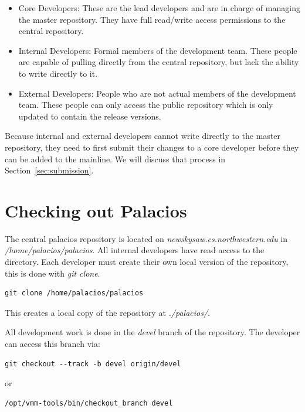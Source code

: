 \documentclass[11pt]{article}
\begin{document}
\begin{itemize}
\item Core Developers: These are the lead developers and are in
charge of managing the master repository. They have full read/write
access permissions to the central repository.

\item Internal Developers: Formal members of the development
team. These people are capable of pulling directly from the central
repository, but lack the ability to write directly to it. 

\item External Developers: People who are not actual members of the
development team. These people can only access the public repository
which is only updated to contain the release versions. 
\end{itemize}

Because internal and external developers cannot write directly to the
master repository, they need to first submit their changes to a core
developer before they can be added to the mainline. We will discuss
that process in Section~\ref{sec:submission}.


\section{Checking out Palacios}
The central palacios repository is located on {\em
newskysaw.cs.northwestern.edu} in {\em /home/palacios/palacios}. All
internal developers have read access to the directory. Each developer
must create their own local version of the repository, this is done
with {\em git clone}.

\begin{verbatim}
git clone /home/palacios/palacios
\end{verbatim}

This creates a local copy of the repository at {\em ./palacios/}.


All development work is done in the {\em devel} branch of the
repository. The developer can access this branch via:

\begin{verbatim}
git checkout --track -b devel origin/devel
\end{verbatim}

or 

\begin{verbatim}
/opt/vmm-tools/bin/checkout_branch devel
\end{verbatim}
\end{document}
